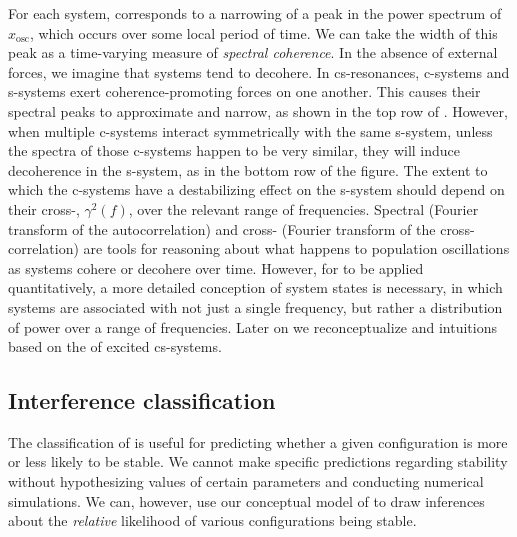   For each system,  corresponds to a narrowing of a peak in the power spectrum of $x_{\text{osc}}$, which occurs over some local period of time. We can take the width of this peak as a time-varying measure of \textit{spectral coherence}. In the absence of external forces, we imagine that systems tend to decohere. In cs-resonances, c-systems and s-systems exert coherence-promoting forces on one another. This causes their spectral peaks to approximate and narrow, as shown in the top row of {}. However, when multiple c-systems interact symmetrically with the same s-system, unless the spectra of those c-systems happen to be very similar, they will induce decoherence in the s-system, as in the bottom row of the figure. The extent to which the c-systems have a destabilizing effect on the s-system should depend on their cross-, $γ^2(f)$, over the relevant range of frequencies. Spectral  (Fourier transform of the autocorrelation) and cross- (Fourier transform of the cross-correlation) are tools for reasoning about what happens to population oscillations as systems cohere or decohere over time. However, for  to be applied quantitatively, a more detailed  conception of system states is necessary, in which systems are associated with not just a single frequency, but rather a distribution of power over a range of frequencies. Later on we reconceptualize  and  intuitions based on the  of excited cs-systems.

\subsection{Interference classification}

The classification of  is useful for predicting whether a given configuration is more or less likely to be stable. We cannot make specific predictions regarding stability without hypothesizing values of certain parameters and conducting numerical simulations. We can, however, use our conceptual model of  to draw inferences about the \textit{relative} likelihood of various configurations being stable.

